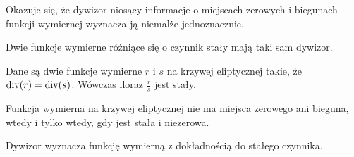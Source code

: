 Okazuje się, że dywizor niosący informacje o miejscach zerowych i biegunach
funkcji wymiernej wyznacza ją niemalże jednoznacznie.

\begin{fact}
Dwie funkcje wymierne różniące się o czynnik stały mają taki sam dywizor.
\end{fact}

\begin{theorem}
Dane są dwie funkcje wymierne $r$ i $s$ na krzywej eliptycznej takie,
że $\operatorname{div}(r) = \operatorname{div}(s)$.
Wówczas iloraz $\frac{r}{s}$ jest stały.
\end{theorem}

\begin{corollary}
Funkcja wymierna na krzywej eliptycznej nie ma miejsca zerowego ani bieguna,
wtedy i tylko wtedy, gdy jest stała i niezerowa.
\end{corollary}

\begin{corollary}
Dywizor wyznacza funkcję wymierną z dokładnością do stałego czynnika.
\end{corollary}
